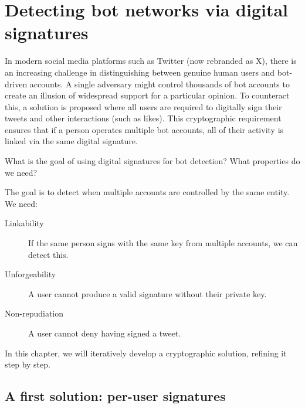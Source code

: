 \chapter{Detecting bot networks via digital signatures}\label{TwitterSignature}

In modern social media platforms such as Twitter (now rebranded as X), there is
an increasing challenge in distinguishing between genuine human users and
bot-driven accounts.
A single adversary might control thousands of bot accounts to create an
illusion of widespread support for a particular opinion.
To counteract this, a solution is proposed where all users are required to
digitally sign their tweets and other interactions (such as likes).
This cryptographic requirement ensures that if a person operates multiple bot
accounts, all of their activity is linked via the same digital signature.

\begin{exercise}\label{BotDetectionGoal}
  What is the goal of using digital signatures for bot detection?
  What properties do we need?
\end{exercise}

The goal is to detect when multiple accounts are controlled by the same
entity.
We need:
\begin{description}
  \item[Linkability] If the same person signs with the same key from
    multiple accounts, we can detect this.
  \item[Unforgeability] A user cannot produce a valid signature without
    their private key.
  \item[Non-repudiation] A user cannot deny having signed a tweet.
\end{description}

In this chapter, we will iteratively develop a cryptographic solution,
refining it step by step.
\chapterminitoc
\section{A first solution: per-user signatures}\label{BotFirstSolution}


